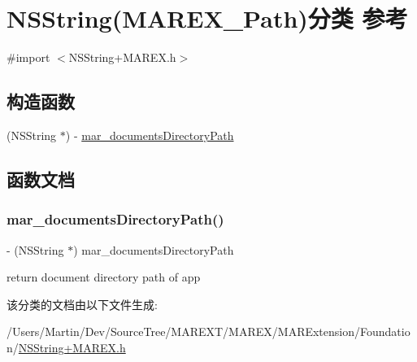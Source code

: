 \hypertarget{category_n_s_string_07_m_a_r_e_x___path_08}{}\section{N\+S\+String(M\+A\+R\+E\+X\+\_\+\+Path)分类 参考}
\label{category_n_s_string_07_m_a_r_e_x___path_08}


{\ttfamily \#import $<$N\+S\+String+\+M\+A\+R\+E\+X.\+h$>$}

\subsection*{构造函数}
\begin{DoxyCompactItemize}
\item 
(N\+S\+String $\ast$) -\/ \hyperlink{category_n_s_string_07_m_a_r_e_x___path_08_aaa27e1f81e28d684451a3f43ee88a77a}{mar\+\_\+documents\+Directory\+Path}
\end{DoxyCompactItemize}


\subsection{函数文档}
\mbox{\label{category_n_s_string_07_m_a_r_e_x___path_08_aaa27e1f81e28d684451a3f43ee88a77a}} 
\subsubsection{\texorpdfstring{mar\+\_\+documents\+Directory\+Path()}{mar\_documentsDirectoryPath()}}
{\footnotesize\ttfamily -\/ (N\+S\+String $\ast$) mar\+\_\+documents\+Directory\+Path \begin{DoxyParamCaption}{ }\end{DoxyParamCaption}}

return document directory path of app 

该分类的文档由以下文件生成\+:\begin{DoxyCompactItemize}
\item 
/\+Users/\+Martin/\+Dev/\+Source\+Tree/\+M\+A\+R\+E\+X\+T/\+M\+A\+R\+E\+X/\+M\+A\+R\+Extension/\+Foundation/\hyperlink{_n_s_string_09_m_a_r_e_x_8h}{N\+S\+String+\+M\+A\+R\+E\+X.\+h}\end{DoxyCompactItemize}
